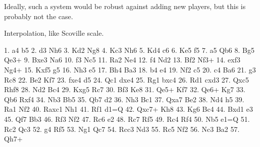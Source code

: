 \documentclass[10pt,preprint,twocolumn]{acmart}
\begin{document}

Ideally, such a system would be robust against adding new players,
but this is probably not the case.


% 

Interpolation, like Scoville scale.


1. a4 b5 2. d3 Nh6 3. Kd2 Ng8 4. Kc3 Nh6
5. Kd4 c6 6. Ke5 f5 7. a5 Qb6 8. Bg5 Qe3+
9. Bxe3 Na6 10. f3 Nc5 11. Ra2 Ne4 12. f4 Nd2
13. Bf2 Nf3+ 14. exf3 Ng4+ 15. Kxf5 g5 16. Nh3 e5
17. Bh4 Ba3 18. b4 e4 19. Nf2 c5 20. c4 Ba6
21. g3 Rc8 22. Be2 Kf7 23. fxe4 d5 24. Qc1 dxe4
25. Rg1 bxc4 26. Rd1 cxd3 27. Qxc5 Rhf8 28. Nd2 Bc4
29. Kxg5 Rc7 30. Bf3 Ke8 31. Qe5+ Kf7 32. Qe6+ Kg7
33. Qb6 Rxf4 34. Nb3 Bb5 35. Qb7 d2 36. Nh3 Bc1
37. Qxa7 Be2 38. Nd4 h5 39. Ra1 Nf2 40. Raxc1 Nh1
41. Rf1 d1=Q 42. Qxc7+ Kh8 43. Kg6 Bc4 44. Bxd1 e3
45. Qf7 Bb3 46. Rf3 Nf2 47. Rc6 e2 48. Rc7 Rf5
49. Rc4 Rf4 50. Nb5 e1=Q 51. Rc2 Qc3 52. g4 Rf5
53. Ng1 Qc7 54. Rcc3 Nd3 55. Rc5 Nf2 56. Nc3 Ba2
57. Qh7+






\end{document}
